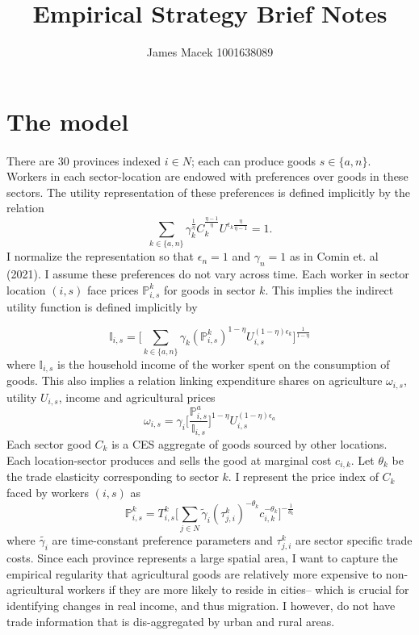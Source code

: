 \documentclass[]{article}
\title{Empirical Strategy Brief Notes}
\author{James Macek 1001638089}
\begin{document}
\maketitle


\section{The model}
\paragraph*{}
There are 30 provinces indexed $i \in N$; each can produce goods $s \in \{a, n\}$. Workers in each sector-location are endowed with preferences over goods in these sectors. The utility representation of these preferences is defined implicitly by the relation 
\begin{equation}
\sum_{k \in \{a, n\}}\gamma_{k}	^{\frac{1}{\eta}}C_{k}^{\frac{\eta - 1}{\eta}}U^{\epsilon_{k}\frac{\eta}{\eta - 1}} = 1.
\end{equation}
I normalize the representation so that $\epsilon_{n} = 1$ and $\gamma_{n} = 1$ as in Comin et. al (2021). I assume these preferences do not vary across time. Each worker in sector location $(i, s)$ face prices $\mathbb{P}_{i, s}^{k}$ for goods in sector $k$. This implies the indirect utility function is defined implicitly by 

\begin{equation} \label{indirectu}
\mathbb{I}_{i, s} =  \bigg[\sum_{k \in \{a, n\}} \gamma_{k}(\mathbb{P}_{i, s}^{k})^{1-\eta}U_{i, s}^{(1-\eta)\epsilon_{k}} \bigg]^{\frac{1}{1-\eta}}
\end{equation}
where $\mathbb{I}_{i, s}$ is the household income of the worker spent on the consumption of goods. This also implies a relation linking expenditure shares on agriculture $\omega_{i, s}$, utility $U_{i, s}$, income and agricultural prices   
\begin{equation} \label{omega}
	\omega_{i, s} = \gamma_{i}\bigg[\frac{\mathbb{P}^{a}_{i, s}}{\mathbb{I}_{i, s}}\bigg]^{1-\eta}U_{i, s}^{(1-\eta)\epsilon_{a}}
\end{equation}
Each sector good $C_{k}$ is a CES aggregate of goods sourced by other locations. Each location-sector produces and sells the good at marginal cost $c_{i, k}$. Let $\theta_{k}$ be the trade elasticity corresponding to sector $k$. I represent the price index of $C_{k}$ faced by workers $(i, s)$ as
\begin{equation} \label{priceindexst}
\mathbb{P}^{k}_{i, s} =	T^{k}_{i, s}\bigg[\sum_{j \in N}\tilde{\gamma}_{i}(\tau_{j, i}^{k})^{-\theta_{k}}c_{i, k}^{-\theta_{k}}\bigg]^{-\frac{1}{\theta_{k}}}
\end{equation}
where $\tilde{\gamma_{i}}$ are time-constant preference parameters and $\tau^{k}_{j, i}$ are sector specific trade costs. Since each province represents a large spatial area, I want to capture the empirical regularity that agricultural goods are relatively more expensive to non-agricultural workers if they are more likely to reside in cities-- which is crucial for identifying changes in real income, and thus migration. I however, do not have trade information that is dis-aggregated by urban and rural areas.
\end{document}
